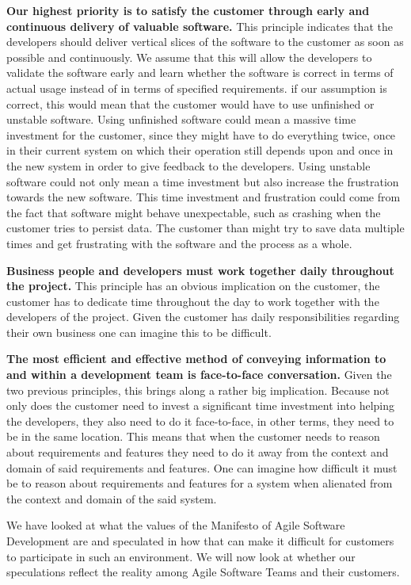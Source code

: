 \textbf{Our highest priority is to satisfy the customer through early and continuous delivery of valuable software.} This principle indicates that the developers should deliver vertical slices of the software to the customer as soon as possible and continuously. We assume that this will allow the developers to validate the software early and learn whether the software is correct in terms of actual usage instead of in terms of specified requirements. if our assumption is correct, this would mean that the customer would have to use unfinished or unstable software. Using unfinished software could mean a massive time investment for the customer, since they might have to do everything twice, once in their current system on which their operation still depends upon and once in the new system in order to give feedback to the developers. Using unstable software could not only mean a time investment but also increase the frustration towards the new software. This time investment and frustration could come from the fact that software might behave unexpectable, such as crashing when the customer tries to persist data. The customer than might try to save data multiple times and get frustrating with the software and the process as a whole.

\textbf{Business people and developers must work together daily throughout the project.} This principle has an obvious implication on the customer, the customer has to dedicate time throughout the day to work together with the developers of the project. Given the customer has daily responsibilities regarding their own business one can imagine this to be difficult.

\textbf{The most efficient and effective method of conveying information to and within a development team is face-to-face conversation.} Given the two previous principles, this brings along a rather big implication. Because not only does the customer need to invest a significant time investment into helping the developers, they also need to do it face-to-face, in other terms, they need to be in the same location. This means that when the customer needs to reason about requirements and features they need to do it away from the context and domain of said requirements and features. One can imagine how difficult it must be to reason about requirements and features for a system when alienated from the context and domain of the said system.

We have looked at what the values of the Manifesto of Agile Software Development are and speculated in how that can make it difficult for customers to participate in such an environment. We will now look at whether our speculations reflect the reality among Agile Software Teams and their customers.

